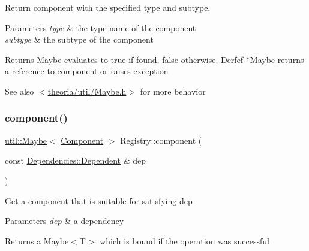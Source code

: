 Return component with the specified type and subtype.


\begin{DoxyParams}{Parameters}
{\em type} & the type name of the component \\
\hline
{\em subtype} & the subtype of the component \\
\hline
\end{DoxyParams}
\begin{DoxyReturn}{Returns}
Maybe evaluates to true if found, false otherwise. Derfef $\ast$\+Maybe returns a reference to component or raises exception 
\end{DoxyReturn}
\begin{DoxySeeAlso}{See also}
$<$\hyperlink{Maybe_8h_source}{theoria/util/\+Maybe.\+h}$>$ for more behavior 
\end{DoxySeeAlso}
\mbox{\label{classtheoria_1_1core_1_1Registry_a535f463285f3232258573c4e8ae2d9f9}} 
\subsubsection{\texorpdfstring{component()}{component()}\hspace{0.1cm}{\footnotesize\ttfamily [4/4]}}
{\footnotesize\ttfamily \hyperlink{classtheoria_1_1util_1_1Maybe}{util\+::\+Maybe}$<$ \hyperlink{classtheoria_1_1core_1_1Component}{Component} $>$ Registry\+::component (\begin{DoxyParamCaption}\item[{const \hyperlink{structtheoria_1_1core_1_1Dependencies_1_1Dependent}{Dependencies\+::\+Dependent} \&}]{dep }\end{DoxyParamCaption})}

Get a component that is suitable for satisfying dep


\begin{DoxyParams}{Parameters}
{\em dep} & a dependency \\
\hline
\end{DoxyParams}
\begin{DoxyReturn}{Returns}
a Maybe$<$\+T$>$ which is bound if the operation was successful 
\end{DoxyReturn}
\mbox{\label{classtheoria_1_1core_1_1Registry_aea2d62c83c04fddd8959bed80c556ca3}} 
